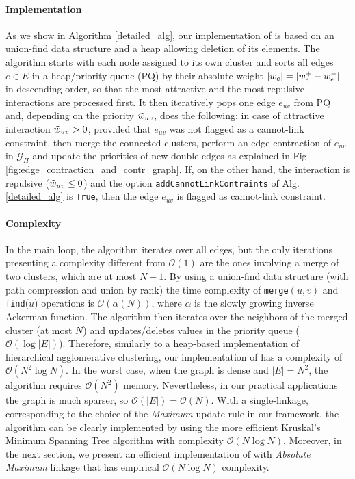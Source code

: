 \paragraph{Implementation} As we show in Algorithm \ref{detailed_alg}, our implementation of \algname{} is based on an union-find data structure and a heap allowing deletion of its elements. The algorithm starts with each node assigned to its own cluster and sorts all edges $e\in E$ in a heap/priority queue (PQ) by their absolute weight $|w_e|=|w_e^+ - w_e^-|$ in descending order, so that the most attractive and the most repulsive interactions are processed first. It then iteratively pops one edge $e_{uv}$ from PQ and, depending on the priority $\tilde{w}_{uv}$, does the following: in case of attractive interaction $\tilde{w}_{uv}>0$, provided that $e_{uv}$ was not flagged as a cannot-link constraint, then merge the connected clusters, perform an edge contraction of $e_{uv}$ in $\tilde{\mathcal{G}}_\Pi$ and update the priorities of new double edges as explained in Fig. \ref{fig:edge_contraction_and_contr_graph}. 
If, on the other hand, the interaction is repulsive ($\tilde{w}_{uv}\leq 0$) and the option \texttt{addCannotLinkContraints} of Alg. \ref{detailed_alg} is \texttt{True}, then the edge $e_{uv}$ is flagged as cannot-link constraint.

\paragraph*{Complexity} In the main loop, the algorithm iterates over all edges, but the only iterations presenting a complexity different from $\mathcal{O}(1)$ are the ones involving a merge of two clusters, which are at most $N-1$. By using a union-find data structure (with path compression and union by rank) the time complexity of \texttt{merge}$(u, v)$ and \texttt{find}($u$) operations is $\mathcal{O}(\alpha(N))$, where $\alpha$ is the slowly growing inverse Ackerman function. The algorithm then iterates over the neighbors of the merged cluster (at most $N$) and updates/deletes values in the priority queue ($\mathcal{O}(\log |E|)$). Therefore, similarly to a heap-based implementation of hierarchical agglomerative clustering, our implementation of \algname{} has a complexity of $\mathcal{O}(N^2 \log N)$. In the worst case, when the graph is dense and $|E|=N^2$, the algorithm requires $\mathcal{O}(N^2)$ memory. Nevertheless, in our practical applications the graph is much sparser, so $\mathcal{O}(|E|)=\mathcal{O}(N)$. 
With a single-linkage, corresponding to the choice of the \emph{Maximum} update rule in our framework, the algorithm can be clearly implemented by using the more efficient Kruskal's Minimum Spanning Tree algorithm with complexity $\mathcal{O}(N \log N)$. 
Moreover, in the next section, we present an efficient implementation of \algname{} with \emph{Absolute Maximum} linkage that has empirical $\mathcal{O}(N \log N)$ complexity. %



